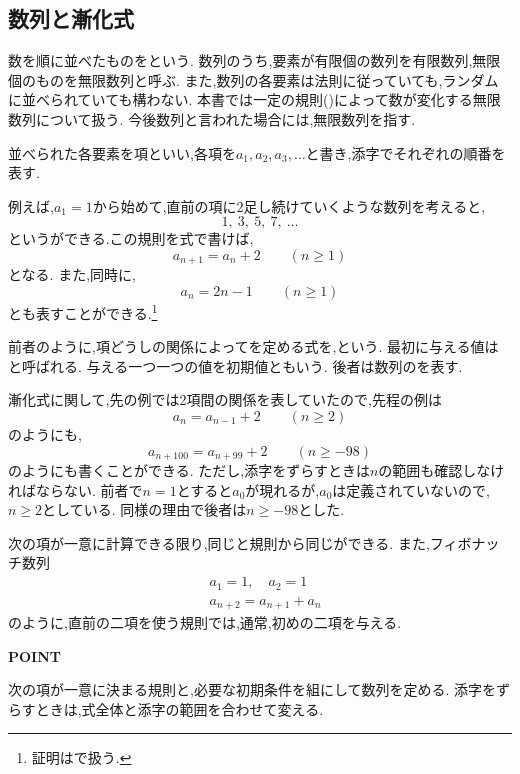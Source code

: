 \subsection{数列と漸化式}\label{節：数列と漸化式}
数を順に並べたものをという.
数列のうち,要素が有限個の数列を有限数列,無限個のものを無限数列と呼ぶ.
また,数列の各要素は法則に従っていても,ランダムに並べられていても構わない.
本書では一定の規則()によって数が変化する無限数列について扱う.
今後数列と言われた場合には,無限数列を指す.

並べられた各要素を項といい,各項を$a_1,\allowbreak a_2,\allowbreak a_3,\allowbreak \ldots$と書き,添字でそれぞれの順番を表す.

例えば,$a_1=1$から始めて,直前の項に$2$足し続けていくような数列を考えると,
\[
  1,\ 3,\ 5,\ 7,\ \ldots
\]
というができる.この規則を式で書けば,
\[
  a_{n+1}=a_n+2\qquad(n\ge1)
\]
となる.
また,同時に,
\[
  a_n=2n-1 \qquad (n\ge1)
\]
とも表すことができる.\footnote{証明はで扱う.}

前者のように,項どうしの関係によってを定める式を,という.
最初に与える値はと呼ばれる.
与える一つ一つの値を初期値ともいう.
後者は数列のを表す.

漸化式に関して,先の例では2項間の関係を表していたので,先程の例は
\[
  a_{n}=a_{n-1}+2\qquad(n\ge2)
\]
のようにも,
\[
  a_{n+100}=a_{n+99}+2\qquad(n\ge-98)
\]
のようにも書くことができる.
ただし,添字をずらすときは$n$の範囲も確認しなければならない.
前者で$n=1$とすると$a_0$が現れるが,$a_0$は定義されていないので,$n\ge2$としている.
同様の理由で後者は$n\ge-98$とした.

次の項が一意に計算できる限り,同じと規則から同じができる.
また,フィボナッチ数列
\begin{align*}
  &a_1=1,\quad a_2=1\\
  &a_{n+2}=a_{n+1}+a_n
\end{align*}
のように,直前の二項を使う規則では,通常,初めの二項を与える.

\begin{bookpoint}
  \textbf{POINT}\par
  次の項が一意に決まる規則と,必要な初期条件を組にして数列を定める.
  添字をずらすときは,式全体と添字の範囲を合わせて変える.
\end{bookpoint}
